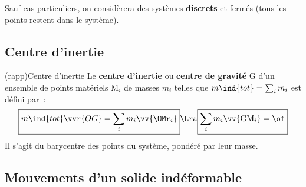 \documentclass[../../main/main.tex]{subfiles}
\begin{document}
Sauf cas particuliers, on considèrera des systèmes \textbf{discrets} et
\ul{fermés} (tous les points restent dans le système).

\subsection{Centre d'inertie}
\begin{tcb*}(rapp){Centre d'inertie}
	Le \textbf{centre d'inertie} ou \textbf{centre de gravité} G d'un ensemble
	de points matériels M$_i$ de masses $m_i$ telles que $m\ind{tot} = \sum_i
		m_i$ est défini par~:
	\[
		\boxed{m\ind{tot}\vvr{OG} = \sum_i m_i \vv{{\OMr}_i}}
		\Lra
		\boxed{\sum_i m_i\vv{{\rm GM}_i} = \of}
	\]
	Il s'agit du barycentre des points du système, pondéré par leur masse.
\end{tcb*}

\subsection{Mouvements d'un solide indéformable}
\end{document}
